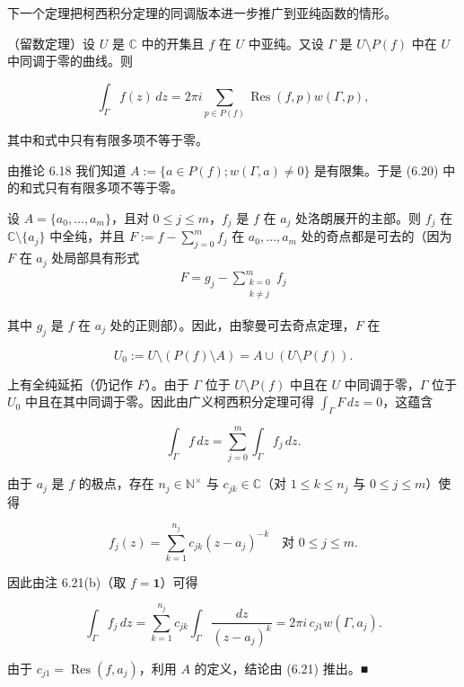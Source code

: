 下一个定理把柯西积分定理的同调版本进一步推广到亚纯函数的情形。

\begin{theorem}

（留数定理）设 $ U $ 是 $ \mathbb{C} $ 中的开集且 $ f $ 在 $ U $ 中亚纯。又设 $ \Gamma $ 是 $ U\setminus P(f) $ 中在 $ U $ 中同调于零的曲线。则

\begin{equation}
\int_{\Gamma}f(z)\,dz = 2\pi i\sum_{p\in P(f)}\operatorname{Res}(f,p)w(\Gamma,p) ,\tag{6.20}
\end{equation}

其中和式中只有有限多项不等于零。

\proofhead
由推论 6.18 我们知道 $ A := \{a \in P(f) ; w(\Gamma,a) \ne 0\} $ 是有限集。于是 (6.20) 中的和式只有有限多项不等于零。

设 $ A = \{a_{0},\ldots,a_{m}\} $，且对 $ 0 \le j \le m $，$ f_{j} $ 是 $ f $ 在 $ a_{j} $ 处洛朗展开的主部。则 $ f_{j} $ 在 $ \mathbb{C}\setminus\{a_{j}\} $ 中全纯，并且 $ F := f - \sum_{j=0}^{m}f_{j} $ 在 $ a_{0},\ldots,a_{m} $ 处的奇点都是可去的（因为 $ F $ 在 $ a_{j} $ 处局部具有形式
\begin{equation*}
\begin{aligned}
F = g_{j} - \sum_{\substack{k=0 \\ k \ne j}}^{m}f_{j}
\end{aligned}
\end{equation*}

其中 $ g_{j} $ 是 $ f $ 在 $ a_{j} $ 处的正则部）。因此，由黎曼可去奇点定理，$ F $ 在

\[
U_{0} := U\setminus\left(P(f)\setminus A\right) = A\cup\left(U\setminus P(f)\right) .
\]

上有全纯延拓（仍记作 $ F $）。由于 $ \Gamma $ 位于 $ U\setminus P(f) $ 中且在 $ U $ 中同调于零，$ \Gamma $ 位于 $ U_{0} $ 中且在其中同调于零。因此由广义柯西积分定理可得 $ \int_{\Gamma}F\,dz = 0 $，这蕴含

\begin{equation}
\int_{\Gamma}f\,dz = \sum_{j=0}^{m}\int_{\Gamma}f_{j}\,dz .\tag{6.21}
\end{equation}

由于 $ a_{j} $ 是 $ f $ 的极点，存在 $ n_{j} \in \mathbb{N}^{\times} $ 与 $ c_{jk} \in \mathbb{C} $（对 $ 1 \le k \le n_{j} $ 与 $ 0 \le j \le m $）使得

\[
f_{j}(z) = \sum_{k=1}^{n_{j}}c_{jk}(z - a_{j})^{-k} \quad \text{对 } 0 \le j \le m .
\]

因此由注 6.21(b)（取 $ f = \mathbf{1} $）可得

\[
\int_{\Gamma}f_{j}\,dz = \sum_{k=1}^{n_{j}}c_{jk}\int_{\Gamma}\frac{dz}{(z - a_{j})^{k}} = 2\pi i\,c_{j1}w(\Gamma,a_{j}) .
\]

由于 $ c_{j1} = \operatorname{Res}(f,a_{j}) $，利用 $ A $ 的定义，结论由 (6.21) 推出。\nobreak\hspace{0.35em}■

\end{theorem}

